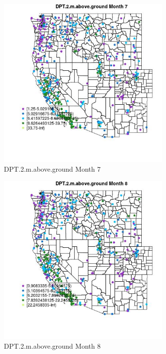 \begin{figure} 
\centering  
\includegraphics[width=0.77\textwidth]{Code_Outputs/ML_input_report_ML_input_PM25_Step5_part_d_de_duplicated_aves_ML_input_MapObsMo7DPT2maboveground.jpg} 
\caption{\label{fig:ML_input_report_ML_input_PM25_Step5_part_d_de_duplicated_aves_ML_inputMapObsMo7DPT2maboveground}DPT.2.m.above.ground Month 7} 
\end{figure} 
 

\begin{figure} 
\centering  
\includegraphics[width=0.77\textwidth]{Code_Outputs/ML_input_report_ML_input_PM25_Step5_part_d_de_duplicated_aves_ML_input_MapObsMo8DPT2maboveground.jpg} 
\caption{\label{fig:ML_input_report_ML_input_PM25_Step5_part_d_de_duplicated_aves_ML_inputMapObsMo8DPT2maboveground}DPT.2.m.above.ground Month 8} 
\end{figure} 
 

